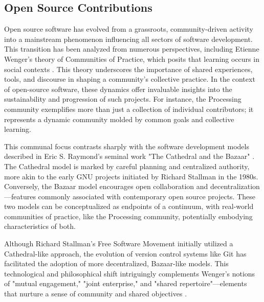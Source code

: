 
\subsection{Open Source Contributions}

Open source software has evolved from a grassroots, community-driven activity into a mainstream phenomenon influencing all sectors of software development. This transition has been analyzed from numerous perspectives, including Etienne Wenger's theory of Communities of Practice, which posits that learning occurs in social contexts \parencite{wengerCommunitiesPracticeLearning1998}. This theory underscores the importance of shared experiences, tools, and discourse in shaping a community's collective practice. In the context of open-source software, these dynamics offer invaluable insights into the sustainability and progression of such projects. For instance, the Processing community exemplifies more than just a collection of individual contributors; it represents a dynamic community molded by common goals and collective learning.

This communal focus contrasts sharply with the software development models described in Eric S. Raymond's seminal work "The Cathedral and the Bazaar" \parencite{CathedralBazaarMusings2002a}. The Cathedral model is marked by careful planning and centralized authority, more akin to the early GNU projects initiated by Richard Stallman in the 1980s. Conversely, the Bazaar model encourages open collaboration and decentralization—features commonly associated with contemporary open source projects. These two models can be conceptualized as endpoints of a continuum, with real-world communities of practice, like the Processing community, potentially embodying characteristics of both.

Although Richard Stallman's Free Software Movement initially utilized a Cathedral-like approach, the evolution of version control systems like Git has facilitated the adoption of more decentralized, Bazaar-like models. This technological and philosophical shift intriguingly complements Wenger's notions of "mutual engagement," "joint enterprise," and "shared repertoire"—elements that nurture a sense of community and shared objectives \parencite{wengerCommunitiesPracticeLearning1998}.

